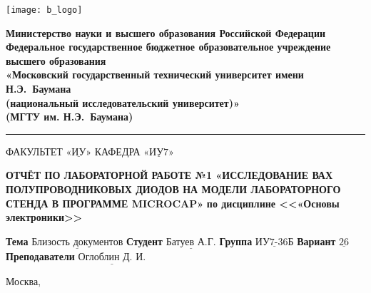 \thispagestyle{empty}

\noindent \begin{minipage}{0.15\textwidth}
	\texttt{[image: b\_logo]}
\end{minipage}
\noindent\begin{minipage}{0.85\textwidth}\centering
	\textbf{Министерство науки и высшего образования Российской Федерации}\\
	\textbf{Федеральное государственное бюджетное образовательное учреждение высшего образования}\\
	\textbf{«Московский государственный технический университет имени Н.Э.~Баумана}\\
	\textbf{(национальный исследовательский университет)»}\\
	\textbf{(МГТУ им. Н.Э.~Баумана)}
\end{minipage}

\noindent\rule{\linewidth}{3pt}
\newline\newline
\noindent ФАКУЛЬТЕТ $\underline{\text{«ИУ»}}$ \newline\newline
\noindent КАФЕДРА $\underline{\text{«ИУ7»}}$

\vspace{1cm}

\begin{center}
	\noindent\begin{minipage}{1.3\textwidth}\centering
		\Large\textbf{ОТЧЁТ ПО ЛАБОРАТОРНОЙ РАБОТЕ №1
		«ИССЛЕДОВАНИЕ ВАХ ПОЛУПРОВОДНИКОВЫХ
		ДИОДОВ НА МОДЕЛИ ЛАБОРАТОРНОГО СТЕНДА В
		ПРОГРАММЕ MICROCAP»}\newline
		\textbf{по дисциплине <<«Основы электроники>>}\newline\newline
	\end{minipage}
\end{center}

\noindent\textbf{Тема} $\underline{\text{Близость документов}}$\newline\newline
\noindent\textbf{Студент} $\underline{\text{Батуев А.Г.}}$\newline\newline
\noindent\textbf{Группа} $\underline{\text{ИУ7-36Б}}$\newline\newline
\noindent\textbf{Вариант} $\underline{\text{26}}$\newline\newline
\noindent\textbf{Преподаватели} $\underline{\text{Оглоблин Д. И.}}$\newline

\begin{center}
	\vfill
	Москва,~\the\year
\end{center}
\clearpage
